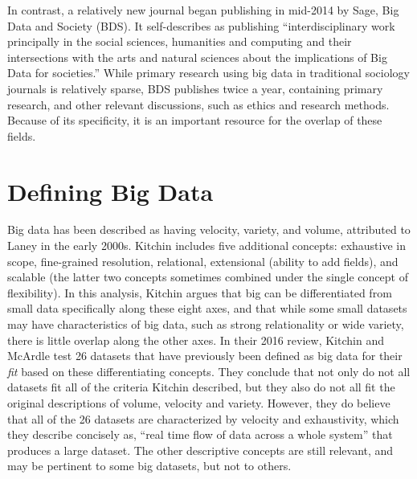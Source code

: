 \documentclass[sigconf]{acmart}
\begin{document}
In contrast, a relatively new journal began publishing in mid-2014 by Sage, Big Data and Society (BDS).  It self-describes as publishing ``interdisciplinary work principally in the social sciences, humanities and computing and their intersections with the arts and natural sciences about the implications of Big Data for societies.''  While primary research using big data in traditional sociology journals is relatively sparse, BDS publishes twice a year, containing primary research, and other relevant discussions, such as ethics and research methods.  Because of its specificity, it is an important resource for the overlap of these fields.

\section{Defining Big Data}
Big data has been described as having velocity, variety, and volume, attributed to Laney in the early 2000s.\cite{japec15}  Kitchin includes five additional concepts: exhaustive in scope, fine-grained resolution, relational, extensional (ability to add fields), and scalable (the latter two concepts sometimes combined under the single concept of flexibility).\cite{kitchin14}  In this analysis, Kitchin argues that big can be differentiated from small data specifically along these eight axes, and that while some small datasets may have characteristics of big data, such as strong relationality or wide variety, there is little overlap along the other axes.   In their 2016 review, Kitchin and McArdle test 26 datasets that have previously been defined as big data for their {\em fit} based on these differentiating concepts.\cite{kitchin16}  They conclude that not only do not all datasets fit all of the criteria Kitchin described, but they also do not all fit the original descriptions of volume, velocity and variety.  However, they do believe that all of the 26 datasets are characterized by velocity and exhaustivity, which they describe concisely as, ``real time flow of data across a whole system'' that produces a large dataset.  The other descriptive concepts are still relevant, and may be pertinent to some big datasets, but not to others.
\end{document}
